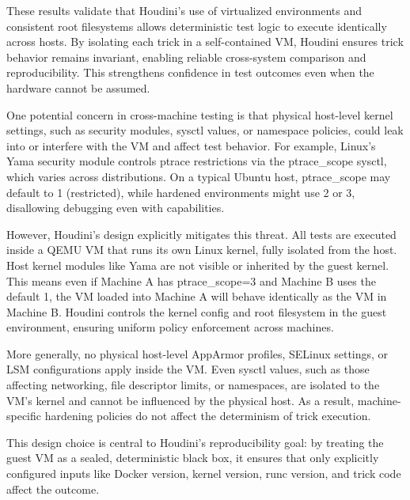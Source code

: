 \documentclass[12pt]{report}
\begin{document}
\begin{doublespace}
These results validate that Houdini’s use of virtualized environments and consistent root filesystems allows deterministic test logic to execute identically across hosts. By isolating each trick in a self-contained VM, Houdini ensures trick behavior remains invariant, enabling reliable cross-system comparison and reproducibility. This strengthens confidence in test outcomes even when the hardware cannot be assumed.

One potential concern in cross-machine testing is that physical host-level kernel settings, such as security modules, sysctl values, or namespace policies, could leak into or interfere with the VM and affect test behavior. For example, Linux’s Yama security module controls ptrace restrictions via the ptrace\_scope sysctl, which varies across distributions. On a typical Ubuntu host, ptrace\_scope may default to 1 (restricted), while hardened environments might use 2 or 3, disallowing debugging even with capabilities.

However, Houdini’s design explicitly mitigates this threat. All tests are executed inside a QEMU VM that runs its own Linux kernel, fully isolated from the host. Host kernel modules like Yama are not visible or inherited by the guest kernel. This means even if Machine A has ptrace\_scope=3 and Machine B uses the default 1, the VM loaded into Machine A will behave identically as the VM in Machine B. Houdini controls the kernel config and root filesystem in the guest environment, ensuring uniform policy enforcement across machines.

More generally, no physical host-level AppArmor profiles, SELinux settings, or LSM configurations apply inside the VM. Even sysctl values, such as those affecting networking, file descriptor limits, or namespaces, are isolated to the VM’s kernel and cannot be influenced by the physical host. As a result, machine-specific hardening policies do not affect the determinism of trick execution.

This design choice is central to Houdini’s reproducibility goal: by treating the guest VM as a sealed, deterministic black box, it ensures that only explicitly configured inputs like Docker version, kernel version, runc version, and trick code affect the outcome.

































\end{doublespace}
\end{document}
